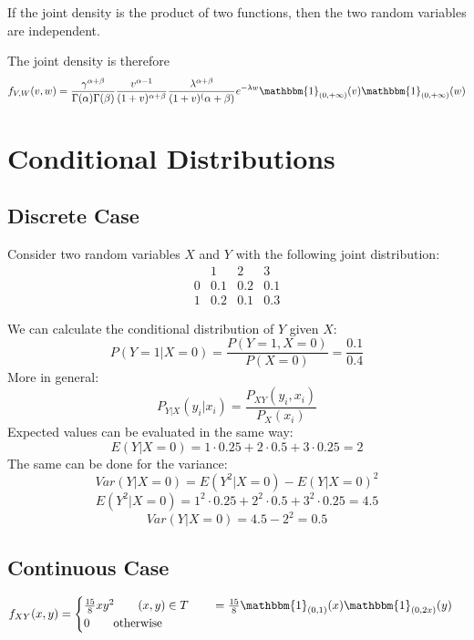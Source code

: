 If the joint density is the product of two functions, then the two random variables are independent.

The joint density is therefore
\[
f_{V, W}(v, w) = \frac{\gamma^{\alpha+\beta}}{\Gamma(\alpha)\Gamma(\beta)} \frac{v^{\alpha-1}}{(1+v)^{\alpha + \beta}}  \frac{\lambda^{\alpha +\beta}}{(1+v)^(\alpha + \beta)} e^{-\lambda w} \mathbbm{1}_{(0, +\infty)}(v) \mathbbm{1}_{(0, +\infty)}(w)
\]

\section{Conditional Distributions}
\subsection*{Discrete Case}

Consider two random variables $X$ and $Y$ with the following joint distribution:
\[
\begin{array}{c|ccc}
    & 1 & 2 & 3  \\
    \hline
    0 & 0.1 & 0.2 & 0.1 \\
    1 & 0.2 & 0.1 & 0.3
\end{array}
\]

We can calculate the conditional distribution of $Y$ given $X$:
\[
P(Y = 1 | X = 0) = \frac{P(Y=1, X=0)}{P(X=0)} = \frac{0.1}{0.4}
\]
More in general:
\[
P_{Y|X}(y_i | x_i) = \frac{P_{XY}(y_i, x_i)}{P_{X}(x_i)}
\]
Expected values can be evaluated in the same way:
\[
E(Y|X = 0) = 1 \cdot 0.25 + 2 \cdot 0.5 + 3 \cdot 0.25 = 2
\]
The same can be done for the variance:
\[
Var(Y|X = 0) = E(Y^2|X = 0) - E(Y|X = 0)^2
\]
\[
E(Y^2|X = 0) = 1^2 \cdot 0.25 + 2^2 \cdot 0.5 + 3^2 \cdot 0.25 = 4.5
\]
\[
Var(Y|X = 0) = 4.5 - 2^2 = 0.5
\]

\subsection*{Continuous Case}

\begin{equation*}
    f_{XY}(x,y) = \begin{cases}
        \frac{15}{8}xy^2 \qquad (x,y) \in T \qquad = \frac{15}{8} \mathbbm{1}_{(0,1)}(x) \mathbbm{1}_{(0,2x)}(y) \\
        0 \qquad \text{otherwise}
    \end{cases}
\end{equation*}

